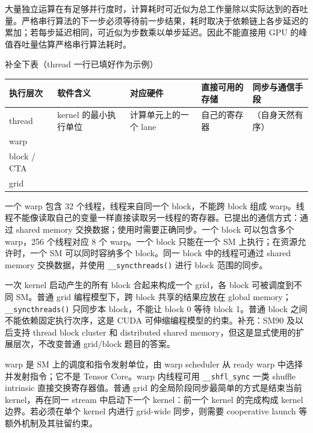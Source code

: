\documentclass[11pt,a4paper,fontset=none]{ctexart}
\begin{document}
\begin{tcolorbox}[title={1.2 作答（讨论后整理）},breakable]
大量独立运算在有足够并行度时，计算耗时可近似为总工作量除以实际达到的吞吐量。严格串行算法的下一步必须等待前一步结果，耗时取决于依赖链上各步延迟的累加；若每步延迟相同，可近似为步数乘以单步延迟。因此不能直接用 GPU 的峰值吞吐量估算严格串行算法耗时。
\end{tcolorbox}

补全下表（thread 一行已填好作为示例）

\begin{center}\small
\begin{tabular}{@{}p{5.2em}p{9em}p{7.5em}p{7.5em}p{8em}@{}}
\toprule
执行层次 & 软件含义 & 对应硬件 & 直接可用的存储 & 同步与通信手段 \\
\midrule
thread & kernel 的最小执行单位 & 计算单元上的一个 lane & 自己的寄存器 & （自身天然有序） \\
warp &  &  &  &  \\
block / CTA &  &  &  &  \\
grid &  &  &  &  \\
\bottomrule
\end{tabular}
\end{center}

\begin{tcolorbox}[title={1.3 已回答部分（其余待补）},breakable]
一个 warp 包含 32 个线程，线程来自同一个 block，不能跨 block 组成 warp。线程不能像读取自己的变量一样直接读取另一线程的寄存器。已提出的通信方式：通过 shared memory 交换数据；使用时需要正确同步。一个 block 可以包含多个 warp，256 个线程对应 8 个 warp。一个 block 只能在一个 SM 上执行；在资源允许时，一个 SM 可以同时容纳多个 block。同一 block 中的线程可通过 shared memory 交换数据，并使用 \texttt{\_\_syncthreads()} 进行 block 范围的同步。

一次 kernel 启动产生的所有 block 合起来构成一个 grid，各 block 可被调度到不同 SM。普通 grid 编程模型下，跨 block 共享的结果应放在 global memory；\texttt{\_\_syncthreads()} 只同步本 block，不能让 block 0 等待 block 1。普通 block 之间不能依赖固定执行次序，这是 CUDA 可伸缩编程模型的约束。补充：SM90 及以后支持 thread block cluster 和 distributed shared memory，但这是显式使用的扩展层次，不改变普通 grid/block 题目的答案。

warp 是 SM 上的调度和指令发射单位，由 warp scheduler 从 ready warp 中选择并发射指令；它不是 Tensor Core。warp 内线程可用 \texttt{\_\_shfl\_sync} 一类 shuffle intrinsic 直接交换寄存器值。普通 grid 的全局阶段同步最简单的方式是结束当前 kernel，再在同一 stream 中启动下一个 kernel：前一个 kernel 的完成构成 kernel 边界。若必须在单个 kernel 内进行 grid-wide 同步，则需要 cooperative launch 等额外机制及其驻留约束。
\end{tcolorbox}
\end{document}
